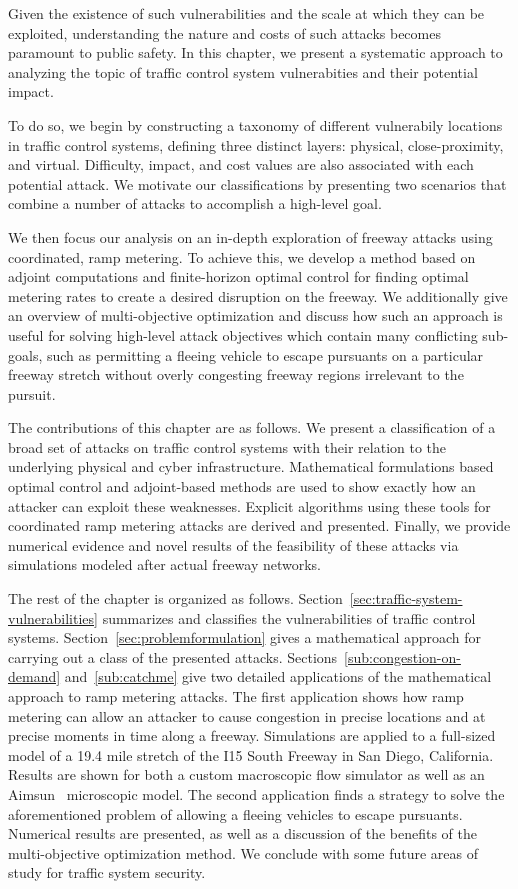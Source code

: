 Given the existence of such vulnerabilities and the scale at which they can be exploited, understanding the nature and costs of such attacks becomes paramount to public safety. In this chapter, we present a systematic approach to analyzing the topic of traffic control system vulnerabities and their potential impact.

To do so, we begin by constructing a taxonomy of different vulnerabily locations in traffic control systems, defining three distinct layers: physical, close-proximity, and virtual. Difficulty, impact, and cost values are also associated with each potential attack.  We motivate our classifications by presenting two scenarios that combine a number of attacks to accomplish a high-level goal.

We then focus our analysis on an in-depth exploration of freeway attacks using coordinated, ramp metering. To achieve this, we develop a method based on adjoint computations and finite-horizon optimal control for finding optimal metering rates to create a desired disruption on the freeway. We additionally give an overview of multi-objective optimization and discuss how such an approach is useful for solving high-level attack objectives which contain many conflicting sub-goals, such as permitting a fleeing vehicle to escape pursuants on a particular freeway stretch without overly congesting freeway regions irrelevant to the pursuit.

The contributions of this chapter are as follows. We present a classification of a broad set of attacks on traffic control systems with their relation to the underlying physical and cyber infrastructure. Mathematical formulations based optimal control and adjoint-based methods are used to show exactly how an attacker can exploit these weaknesses. Explicit algorithms using these tools for coordinated ramp metering attacks are derived and presented. Finally, we provide numerical evidence and novel results of the feasibility of these attacks via simulations modeled after actual freeway networks.

The rest of the chapter is organized as follows. Section~\ref{sec:traffic-system-vulnerabilities} summarizes and classifies the vulnerabilities of traffic control systems. Section~\ref{sec:problemformulation} gives a mathematical approach for carrying out a class of the presented attacks.  Sections~\ref{sub:congestion-on-demand} and~\ref{sub:catchme} give two detailed applications of the mathematical approach to ramp metering attacks. The first application shows how ramp metering can allow an attacker to cause congestion in precise locations and at precise moments in time along a freeway. Simulations are applied to a full-sized model of a 19.4 mile stretch of the I15 South Freeway in San Diego, California. Results are shown for both a custom macroscopic flow simulator as well as an Aimsun~\cite{barcelo2001microscopic} microscopic model. The second application finds a strategy to solve the aforementioned problem of allowing a fleeing vehicles to escape pursuants. Numerical results are presented, as well as a discussion of the benefits of the multi-objective optimization method. We conclude with some future areas of study for traffic system security.


